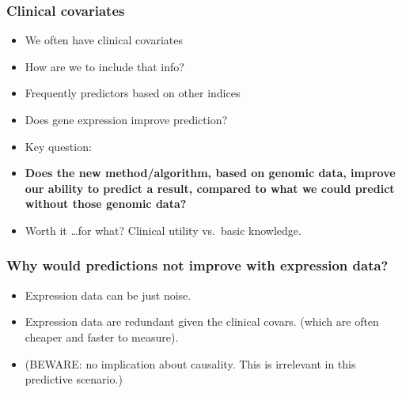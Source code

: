 






\begin{frame}[label = covars]
\frametitle{Clinical covariates}
\begin{itemize}
\item We often have clinical covariates
\item How are we to include that info?
\item Frequently predictors based on other indices
\item Does gene expression improve prediction?
\item Key question: 
\item \textbf{Does the new method/algorithm, based on genomic data,
    improve our ability to predict a result, compared to what we could
    predict without those genomic data?}
\item Worth it \ldots for what? Clinical utility vs.\ basic knowledge.
\end{itemize}
\end{frame}


\begin{frame}
\frametitle{Why would predictions not improve with expression data?}
\begin{itemize}
\item Expression data can be just noise.
\item Expression data are redundant given the clinical covars. (which are
  often cheaper and faster to measure).
\item (BEWARE: no implication about causality. This is irrelevant in this
  predictive scenario.) 
\end{itemize}
\end{frame}


